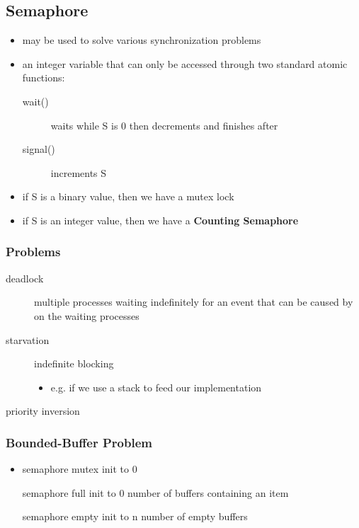 \documentclass[11pt]{article}
\begin{document}
\subsection{Semaphore}
\label{sec:org582d3bd}
\begin{itemize}
\item may be used to solve various synchronization problems
\item an integer variable that can only be accessed through two standard atomic functions:
\begin{description}
\item[{wait()}] waits while S is 0 then decrements and finishes after
\item[{signal()}] increments S
\end{description}
\item if S is a binary value, then we have a mutex lock
\item if S is an integer value, then we have a \textbf{Counting Semaphore}
\end{itemize}
\subsubsection{Problems}
\label{sec:orgb28df4d}
\begin{description}
\item[{deadlock}] multiple processes waiting indefinitely for an event that can be caused by on the waiting processes
\item[{starvation}] indefinite blocking 
\begin{itemize}
\item e.g. if we use a stack to feed our implementation
\end{itemize}
\item[{priority inversion}] 
\end{description}
\subsubsection{Bounded-Buffer Problem}
\label{sec:org26d735c}
\begin{itemize}
\item semaphore mutex init to 0
\item[{semaphore full init to 0}] number of buffers containing an item
\item[{semaphore empty init to n}] number of empty buffers
\end{itemize}
\end{document}
